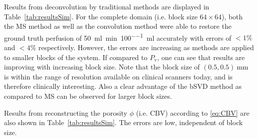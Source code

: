 \documentclass[journal,twocolumn]{IEEEtran}
\newcommand{\Perfv}{P_{\mathrm{v}}}
\newcommand{\siPml}{\milli\litre\per\minute\per100\milli\litre}
\begin{document}
	Results from deconvolution by traditional methods are displayed in Table~\ref{tab:resultsSim}. 
	For the complete domain (i.e. block size $64 \times 64$), both the MS method as well as the convolution method were able to restore the ground truth perfusion of \SI{50}{\siPml} accurately with errors of $<1\%$ and $<4\%$ respectively.
	However, the errors are increasing as methods are applied to smaller blocks of the system.
	If compared to $\Perfv$, one can see that results are improving with increasing block size. 
	Note that the block size of $(0.5,0.5)\SI{}{\milli\meter}$ is within the range of resolution available on clinical scanners today, and is therefore clinically interesting.
	Also a clear advantage of the bSVD method as compared to MS can be observed for larger block sizes.

	Results from reconstructing the porosity $\phi$ (i.e. CBV) according to \eqref{eq:CBV} are also shown in Table~\ref{tab:resultsSim}. The errors are low, independent of block size.
\end{document}
